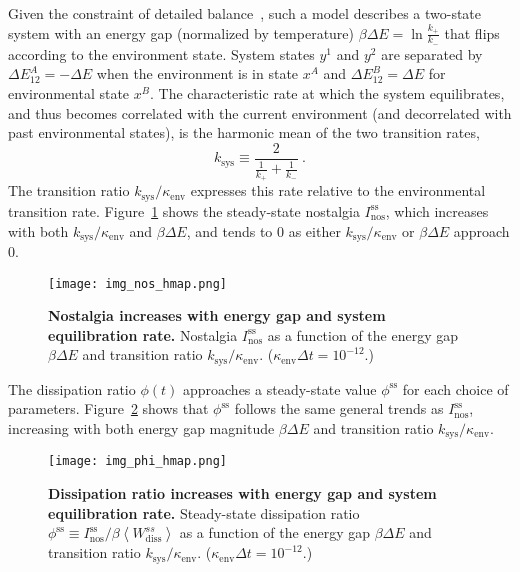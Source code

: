\documentclass[entropy,article,
submit,
moreauthors,pdftex,10pt,a4paper]{mdpi}
\newcommand{\Nos}{I_\mathrm{nos}}
\newcommand{\NosSS}{\Nos^\mathrm{ss}}
\newcommand{\phiSS}{\phi^{\mathrm{ss}}}
\newcommand{\kenv}{\kappa_\mathrm{env}}
\newcommand{\ksys}{k_\mathrm{sys}}
\newcommand{\WdissSS}{\beta \left\langle W_{\mathrm{diss}}^{ss} \right\rangle}
\newcommand{\kstar}{\ksys/\kenv}
\begin{document}
Given the constraint of detailed balance~\cite{Chandler1987a}, such a model describes a two-state system with an energy gap (normalized by temperature) $\beta \Delta E = \ln \frac{k_{+}}{k_{-}}$ that flips according to the environment state. 
System states $y^1$ and $y^2$ are separated by $\Delta E^{A}_{12}=-\Delta E$ when the environment is in state $x^A$ and $\Delta E^{B}_{12}=\Delta E$ for environmental 
state $x^B$. The characteristic rate at which the system equilibrates, and thus becomes correlated with the current environment (and decorrelated with past environmental states), is the harmonic mean of the two transition rates, 
\begin{equation}
\ksys \equiv \frac{2}{\frac{1}{k_{+}} + \frac{1}{k_{-}}} \ . 
\end{equation}
The transition ratio $\kstar$ expresses this rate relative to the environmental transition rate.
Figure~\ref{fig:nos_hm} shows the steady-state nostalgia $\NosSS$, which increases with both $\kstar$ and $\beta \Delta E$, and tends to 0 as either $\kstar$ or $\beta \Delta E$ approach 0.

\begin{figure}[H]
\centering
\texttt{[image: img\_nos\_hmap.png]}
\caption{{\bf Nostalgia increases with energy gap and system equilibration rate.} Nostalgia $\NosSS$ as a function of the energy gap $\beta \Delta E$ and transition ratio $\kstar$. ($\kenv \Delta t = 10^{-12}$.)}
\label{fig:nos_hm}
\end{figure}

The dissipation ratio $\phi(t)$ approaches a steady-state value $\phiSS$ for each choice of parameters. Figure~\ref{fig:phi_hm} shows that $\phiSS$ follows the same general trends as $\NosSS$, increasing with both energy gap magnitude $\beta \Delta E$ and transition ratio $\kstar$.

\begin{figure}[H]
\centering
\texttt{[image: img\_phi\_hmap.png]}
\caption{{\bf 
Dissipation ratio increases with energy gap and system equilibration rate.} Steady-state dissipation ratio $\phiSS\equiv\NosSS/\WdissSS$ as a function of the energy gap $\beta \Delta E$ and transition ratio $\kstar$. ($\kenv \Delta t = 10^{-12}$.)}
\label{fig:phi_hm}
\end{figure}
\end{document}
